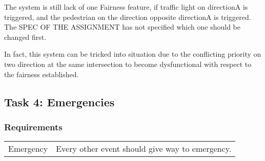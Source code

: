 \documentclass[a4paper]{article}
\begin{document}
The system is still lack of one Fairness feature, if traffic light on directionA is triggered, and the pedestrian on the direction opposite directionA is triggered. The SPEC OF THE ASSIGNMENT has not specified which one should be changed first.

In fact, this system can be tricked into situation due to the conflicting priority on two direction at the same intersection to become dysfunctional with respect to the fairness established.

\newpage

\subsection{Task 4: Emergencies}
\subsubsection{Requirements}

\begin{center}
\begin{tabular}{|p{3.5cm}|p{10cm}|}
\hline
\color{blue}{Requirements} & \color{blue}{Function}\\
\hline
 Emergency & Every other event should give way to emergency.\\
 \hline
\end{tabular}
\end{center}
\end{document}
